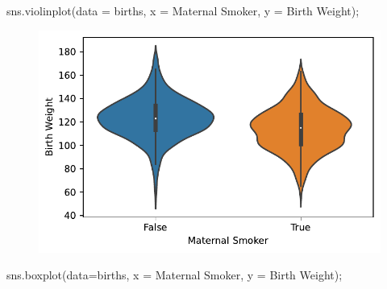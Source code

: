 \documentclass[
  letterpaper,
  DIV=11,
  numbers=noendperiod]{scrreprt}
\newenvironment{Shaded}{\begin{snugshade}}{\end{snugshade}}
\newcommand{\NormalTok}[1]{\textcolor[rgb]{0.00,0.23,0.31}{#1}}
\newcommand{\OperatorTok}[1]{\textcolor[rgb]{0.37,0.37,0.37}{#1}}
\newcommand{\StringTok}[1]{\textcolor[rgb]{0.13,0.47,0.30}{#1}}
\begin{document}
\begin{Shaded}
\begin{Highlighting}[]
\NormalTok{sns.violinplot(data }\OperatorTok{=}\NormalTok{ births, x }\OperatorTok{=} \StringTok{\textquotesingle{}Maternal Smoker\textquotesingle{}}\NormalTok{, y }\OperatorTok{=} \StringTok{\textquotesingle{}Birth Weight\textquotesingle{}}\NormalTok{)}\OperatorTok{;}
\end{Highlighting}
\end{Shaded}

\begin{figure}[H]

{\centering \includegraphics{visualization_1/visualization_1_files/figure-pdf/cell-22-output-1.pdf}

}

\end{figure}

\begin{Shaded}
\begin{Highlighting}[]
\NormalTok{sns.boxplot(data}\OperatorTok{=}\NormalTok{births, x }\OperatorTok{=} \StringTok{\textquotesingle{}Maternal Smoker\textquotesingle{}}\NormalTok{, y }\OperatorTok{=} \StringTok{\textquotesingle{}Birth Weight\textquotesingle{}}\NormalTok{)}\OperatorTok{;}
\end{Highlighting}
\end{Shaded}
\end{document}
